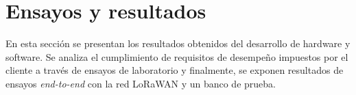 
\chapter{Ensayos y resultados} %
En esta sección se presentan los resultados obtenidos del desarrollo de hardware y software. Se analiza el cumplimiento de requisitos de desempeño impuestos por el cliente a trav\'{e}s de ensayos de laboratorio y finalmente, se exponen resultados de ensayos \textit{end-to-end} con la red LoRaWAN y un banco de prueba.\\
\label{Chapter4} %
